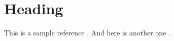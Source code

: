 \section*{Heading}

This is a sample reference \citep{Herzog2016TimeSlices}. And here is another one \citep{Fekete2018CritiqueDiscretePerception}.